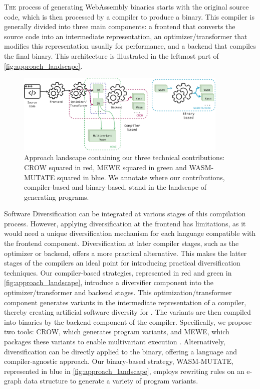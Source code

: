 
\lettrine[lines=3]{T}{he} process of generating WebAssembly binaries starts with the original source code, which is then processed by a compiler to produce a \Wasm binary. 
This compiler is generally divided into three main components: a frontend that converts the source code into an intermediate representation, an optimizer/transformer that modifies this representation usually for performance, and a backend that compiles the final \Wasm binary.
This architecture is illustrated in the leftmost part of \autoref{fig:approach_landscape}.

\begin{figure}[h]
	\centering
	\includegraphics[width=0.9\textwidth]{figures/landscape.pdf}
	\caption{Approach landscape containing our three technical contributions: CROW squared in red, MEWE squared in green and WASM-MUTATE squared in blue. We annotate where our contributions, compiler-based and binary-based, stand in the landscape of generating \Wasm programs.}
	\label{fig:approach_landscape}
\end{figure}

Software Diversification can be integrated at various stages of this compilation process. 
However, applying diversification at the frontend has limitations, as it would need a unique diversification mechanism for each language compatible with the frontend component. 
Diversification at later compiler stages, such as the optimizer or backend, offers a more practical alternative.
This makes the latter stages of the compilers an ideal point for introducing practical \wasm diversification techniques.
Our compiler-based strategies, represented in red and green in \autoref{fig:approach_landscape}, introduce a diversifier component into the optimizer/transformer and backend stages. 
This optimization/transformer component generates variants in the intermediate representation of a compiler, thereby creating artificial software diversity for \Wasm. 
The variants are then compiled into \Wasm binaries by the backend component of the compiler.
Specifically, we propose two tools: CROW, which generates \Wasm program variants, and MEWE, which packages these variants to enable multivariant execution \cite{cox06}.
Alternatively, diversification can be directly applied to the \Wasm binary, offering a language and compiler-agnostic approach. 
Our binary-based strategy, WASM-MUTATE, represented in blue in \autoref{fig:approach_landscape}, employs rewriting rules on an e-graph data structure to generate a variety of \Wasm program variants.

